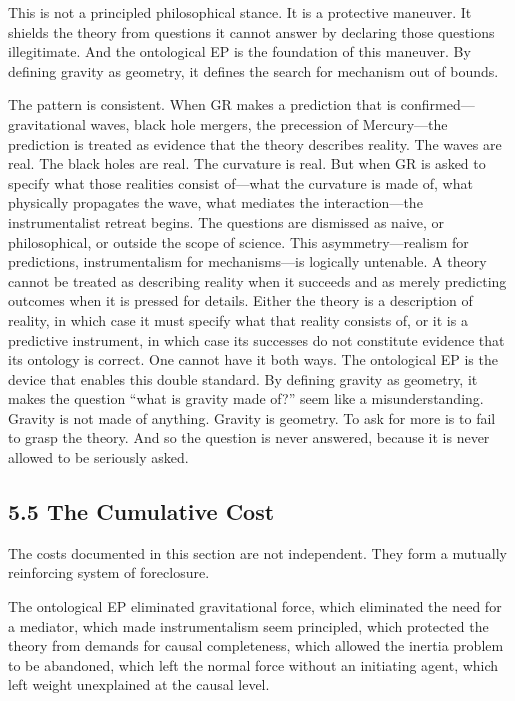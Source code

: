 \documentclass[11pt]{article}
\begin{document}
This is not a principled philosophical stance. It is a protective maneuver. It shields the theory from questions it cannot answer by declaring those questions illegitimate. And the ontological EP is the foundation of this maneuver. By defining gravity as geometry, it defines the search for mechanism out of bounds.

The pattern is consistent. When GR makes a prediction that is confirmed---gravitational waves, black hole mergers, the precession of Mercury---the prediction is treated as evidence that the theory describes reality. The waves are real. The black holes are real. The curvature is real. But when GR is asked to specify what those realities consist of---what the curvature is made of, what physically propagates the wave, what mediates the interaction---the instrumentalist retreat begins. The questions are dismissed as naive, or philosophical, or outside the scope of science. This asymmetry---realism for predictions, instrumentalism for mechanisms---is logically untenable. A theory cannot be treated as describing reality when it succeeds and as merely predicting outcomes when it is pressed for details. Either the theory is a description of reality, in which case it must specify what that reality consists of, or it is a predictive instrument, in which case its successes do not constitute evidence that its ontology is correct. One cannot have it both ways. The ontological EP is the device that enables this double standard. By defining gravity as geometry, it makes the question ``what is gravity made of?'' seem like a misunderstanding. Gravity is not made of anything. Gravity is geometry. To ask for more is to fail to grasp the theory. And so the question is never answered, because it is never allowed to be seriously asked.

\subsection{5.5 The Cumulative Cost}

The costs documented in this section are not independent. They form a mutually reinforcing system of foreclosure.

The ontological EP eliminated gravitational force, which eliminated the need for a mediator, which made instrumentalism seem principled, which protected the theory from demands for causal completeness, which allowed the inertia problem to be abandoned, which left the normal force without an initiating agent, which left weight unexplained at the causal level.
\end{document}
